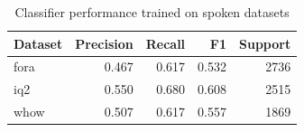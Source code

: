 \begin{table}[t]
\caption{Classifier performance trained on spoken datasets}
\label{tab:metrics_spoken}
\begin{tabular}{lrrrr}
\toprule
Dataset & Precision & Recall & F1 & Support \\
\midrule
fora & 0.467 & 0.617 & 0.532 & 2736 \\
iq2 & 0.550 & 0.680 & 0.608 & 2515 \\
whow & 0.507 & 0.617 & 0.557 & 1869 \\
\bottomrule
\end{tabular}
\end{table}
